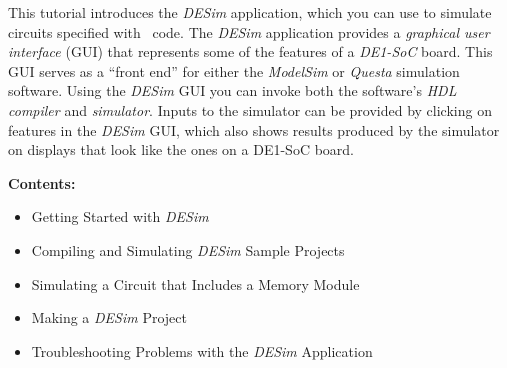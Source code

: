 This tutorial introduces the {\it DESim} application, which you can use to simulate 
circuits specified with \hdlName~code. The {\it DESim} application provides a 
{\it graphical user interface} (GUI) that represents some of the features of a {\it DE1-SoC}
board. This GUI serves as a ``front end'' for either the {\it ModelSim} or {\it Questa} simulation 
software. Using the {\it DESim} GUI you can invoke both the software's {\it HDL compiler} and 
{\it simulator}. Inputs to the simulator can be provided by clicking on features in the
{\it DESim} GUI, which also shows results produced by the simulator on displays that look
like the ones on a DE1-SoC board.

{\bf Contents:}
\vspace{-1em}
\begin{itemize}
\item Getting Started with {\it DESim}
\item Compiling and Simulating {\it DESim} Sample Projects
\item Simulating a Circuit that Includes a Memory Module
\item Making a {\it DESim} Project
\item Troubleshooting Problems with the {\it DESim} Application
\end{itemize}

